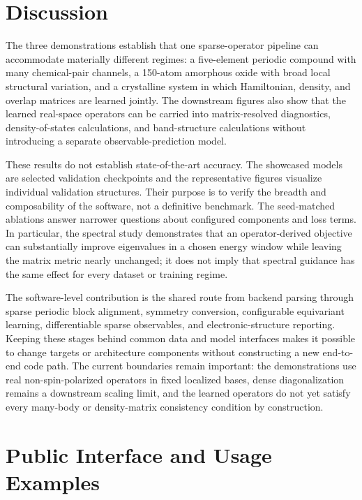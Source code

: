 \documentclass[preprint,12pt,compress,numafflabel]{elsarticle}
\begin{document}
\section{Discussion}
\label{sec:discussion}

The three demonstrations establish that one sparse-operator pipeline can accommodate materially different regimes: a five-element periodic compound with many chemical-pair channels, a 150-atom amorphous oxide with broad local structural variation, and a crystalline system in which Hamiltonian, density, and overlap matrices are learned jointly. The downstream figures also show that the learned real-space operators can be carried into matrix-resolved diagnostics, density-of-states calculations, and band-structure calculations without introducing a separate observable-prediction model.

These results do not establish state-of-the-art accuracy. The showcased models are selected validation checkpoints and the representative figures visualize individual validation structures. Their purpose is to verify the breadth and composability of the software, not a definitive benchmark. The seed-matched ablations answer narrower questions about configured components and loss terms. In particular, the spectral study demonstrates that an operator-derived objective can substantially improve eigenvalues in a chosen energy window while leaving the matrix metric nearly unchanged; it does not imply that spectral guidance has the same effect for every dataset or training regime.

The software-level contribution is the shared route from backend parsing through sparse periodic block alignment, symmetry conversion, configurable equivariant learning, differentiable sparse observables, and electronic-structure reporting. Keeping these stages behind common data and model interfaces makes it possible to change targets or architecture components without constructing a new end-to-end code path. The current boundaries remain important: the demonstrations use real non-spin-polarized operators in fixed localized bases, dense diagonalization remains a downstream scaling limit, and the learned operators do not yet satisfy every many-body or density-matrix consistency condition by construction.

\clearpage
\section{Public Interface and Usage Examples}
\label{sec:usage-examples}
\end{document}
